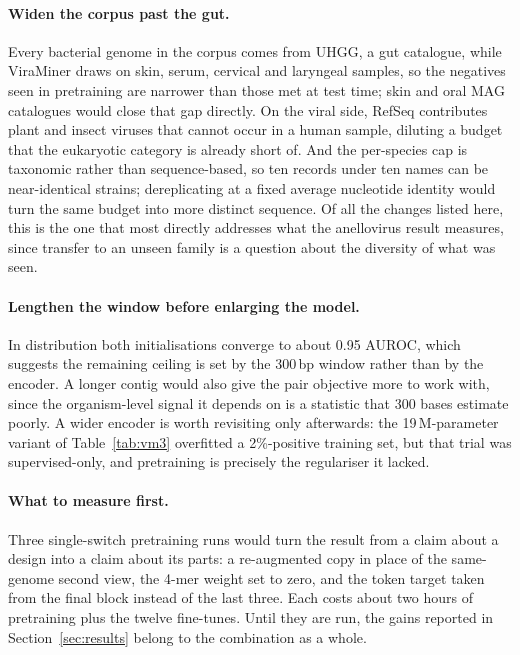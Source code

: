 \documentclass[10pt,twocolumn,a4paper]{article}
\begin{document}
\paragraph{Widen the corpus past the gut.}
Every bacterial genome in the corpus comes from UHGG, a gut catalogue, while
ViraMiner draws on skin, serum, cervical and laryngeal samples, so the negatives
seen in pretraining are narrower than those met at test time; skin and oral MAG
catalogues would close that gap directly. On the viral side, RefSeq contributes
plant and insect viruses that cannot occur in a human sample, diluting a budget
that the eukaryotic category is already short of. And the per-species cap is
taxonomic rather than sequence-based, so ten records under ten names can be
near-identical strains; dereplicating at a fixed average nucleotide identity
would turn the same budget into more distinct sequence. Of all the changes listed
here, this is the one that most directly addresses what the anellovirus result
measures, since transfer to an unseen family is a question about the diversity of
what was seen.

\paragraph{Lengthen the window before enlarging the model.}
In distribution both initialisations converge to about 0.95 AUROC, which suggests
the remaining ceiling is set by the 300\,bp window rather than by the encoder. A
longer contig would also give the pair objective more to work with, since the
organism-level signal it depends on is a statistic that 300 bases estimate
poorly. A wider encoder is worth revisiting only afterwards: the 19\,M-parameter
variant of Table~\ref{tab:vm3} overfitted a 2\%-positive training set, but that
trial was supervised-only, and pretraining is precisely the regulariser it
lacked.

\paragraph{What to measure first.}
Three single-switch pretraining runs would turn the result from a claim about a
design into a claim about its parts: a re-augmented copy in place of the
same-genome second view, the 4-mer weight set to zero, and the token target taken
from the final block instead of the last three. Each costs about two hours of
pretraining plus the twelve fine-tunes. Until they are run, the gains reported in
Section~\ref{sec:results} belong to the combination as a whole.
\end{document}
